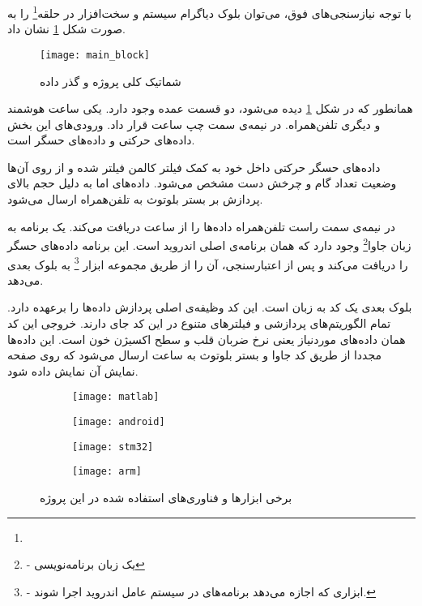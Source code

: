 با توجه نیازسنجی‌های فوق، می‌توان بلوک دیاگرام سیستم و سخت‌افزار در حلقه\footnote{}
را به صورت شکل \ref{fig:main-block} نشان داد.
\newpage
\begin{figure}[h!]
	\centering
	\texttt{[image: main\_block]}
	\caption{شماتیک کلی پروژه و گذر داده}
	\label{fig:main-block}
\end{figure}
\newpage

همانطور که در شکل \ref{fig:main-block} دیده می‌شود، دو قسمت عمده وجود دارد. یکی ساعت هوشمند و دیگری تلفن‌همراه. در نیمه‌ی سمت چپ ساعت قرار داد. ورودی‌های این بخش داده‌های حرکتی و داده‌های حسگر  است.

داده‌های حسگر حرکتی داخل خود به کمک فیلتر کالمن فیلتر شده و از روی آن‌ها وضعیت تعداد گام و چرخش دست مشخص می‌شود. داده‌های  اما به دلیل حجم بالای پردازش بر بستر بلوتوث به تلفن‌همراه ارسال می‌شود.

در نیمه‌ی سمت راست تلفن‌همراه داده‌ها را از ساعت دریافت می‌کند. یک برنامه به زبان جاوا\footnote{ - یک زبان برنامه‌نویسی} وجود دارد که همان برنامه‌ی اصلی اندروید است. این برنامه داده‌های حسگر را دریافت می‌کند و پس از اعتبارسنجی، آن را از طریق مجموعه ابزار
\footnote{ - ابزاری که اجازه می‌دهد برنامه‌های  در سیستم عامل اندروید اجرا شوند.}
به بلوک بعدی می‌دهد.

بلوک بعدی یک کد به زبان  است. این کد وظیفه‌ی اصلی پردازش داده‌ها را برعهده دارد. تمام الگوریتم‌های پردازشی و فیلترهای متنوع در این کد جای دارند. خروجی این کد همان داده‌های موردنیاز یعنی نرخ ضربان قلب و سطح اکسیژن خون است. این داده‌ها مجددا از طریق کد جاوا و بستر بلوتوث به ساعت ارسال می‌شود که روی صفحه نمایش آن نمایش داده شود.

 \begin{figure}[h]
	\centering
	\begin{subfigure}{0.24\textwidth}
		\centering
		\texttt{[image: matlab]}
		\caption{}
	\end{subfigure}
	\begin{subfigure}{0.24\textwidth}
		\centering
		\texttt{[image: android]}
		\caption{}
	\end{subfigure}
	\begin{subfigure}{0.24\textwidth}
		\centering
		\texttt{[image: stm32]}
		\caption{}
	\end{subfigure}
	\begin{subfigure}{0.24\textwidth}
		\centering
		\texttt{[image: arm]}
		\caption{}
	\end{subfigure}
	\caption{برخی ابزارها و فناوری‌های استفاده شده در این پروژه}
	\label{fig:techs}
\end{figure}

